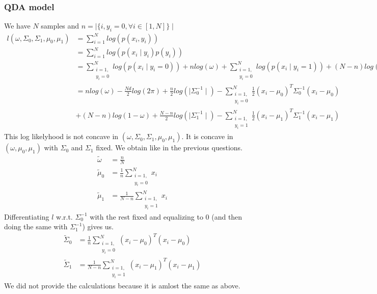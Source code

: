 \documentclass[a4paper]{article}
\begin{document}
\subsubsection{QDA model}
We have $N$ samples and $n=\mid \{i, y_i = 0, \forall i \in [1,N]\}\mid $
\begin{align*}
l(\omega,\Sigma_0, \Sigma_1, \mu_0,\mu_1) &= \sum_{i=1}^N log (p(x_i,y_i)) \\
&= \sum_{i=1}^N log(p(x_i \mid  y_i)p(y_i))\\
&= \sum_{\substack{i=1,\\ y_i=0}}^N log(p(x_i\mid y_i=0)) + nlog(\omega) +  \sum_{\substack{i=1,\\ y_i=0}}^N log(p(x_i\mid y_i=1)) + (N-n)log(1 - \omega)\\
&= nlog(\omega) - \frac{Nd}{2}log(2\pi) + \frac{n}{2}log(\mid \Sigma_0^{-1}\mid)  - \sum_{\substack{i=1,\\ y_i=0}}^N \frac{1}{2}(x_i - \mu_0)^T \Sigma_0^{-1}(x_i - \mu_0) \\ & + (N-n)log(1 -\omega) + \frac{N-n}{2}log(\mid \Sigma_1^{-1}\mid) - \sum_{\substack{i=1,\\ y_i=1}}^N \frac{1}{2}(x_i - \mu_1)^T \Sigma_1^{-1}(x_i - \mu_1)
\end{align*}
This log likelyhood is not concave in $(\omega,\Sigma_0, \Sigma_1, \mu_0, \mu_1)$. It is concave in $(\omega, \mu_0, \mu_1)$ with $\Sigma_0$ and $\Sigma_1$ fixed. We obtain like in the previous questions.
\begin{align*}
\tilde{\omega} &= \frac{n}{N} \\
\tilde{\mu}_0 &= \frac{1}{n} \sum_{\substack{i=1,\\ y_i=0}}^N x_i \\
\tilde{\mu}_1 &= \frac{1}{N-n} \sum_{\substack{i=1,\\ y_i=1}}^N x_i
\end{align*}
Differentiating $l$ w.r.t. $\Sigma_0^{-1}$ with the rest fixed and equalizing to 0 (and then doing the same with $\Sigma_1^{-1}$) gives us.
\begin{align*}
\tilde{\Sigma}_0 &= \frac{1}{n} \sum_{\substack{i=1,\\ y_i=0}}^N (x_i - \mu_0)^T(x_i - \mu_0) \\
\tilde{\Sigma}_1 &= \frac{1}{N-n} \sum_{\substack{i=1,\\ y_i=1}}^N (x_i - \mu_1)^T(x_i - \mu_1)
\end{align*}
We did not provide the calculations because it is amlost the same as above.
\end{document}
